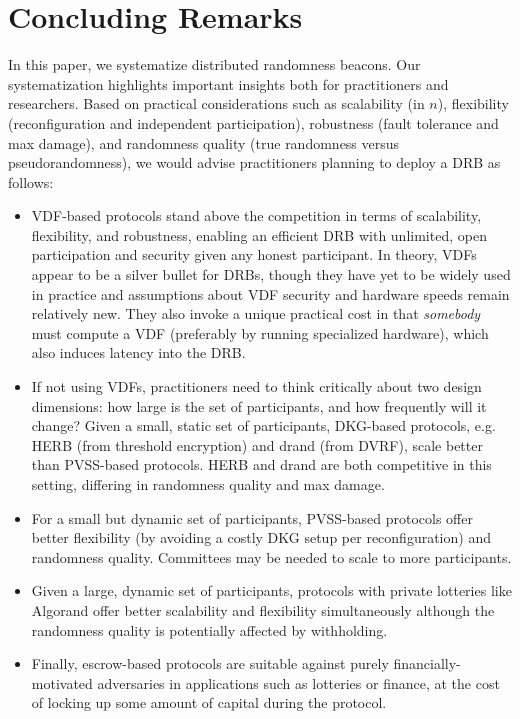 \section{Concluding Remarks}
\label{section:conclusion}
In this paper, we systematize distributed randomness beacons.
Our systematization highlights important insights both for practitioners and researchers. Based on practical considerations such as scalability (in $n$), flexibility (reconfiguration and independent participation), robustness (fault tolerance and max damage), and randomness quality (true randomness versus pseudorandomness), we would advise practitioners planning to deploy a DRB as follows:
\begin{itemize}
    \item {}VDF-based protocols stand above the competition in terms of scalability, flexibility, and robustness, enabling an efficient DRB with unlimited, open participation and security given any honest participant. In theory, VDFs appear to be a silver bullet for DRBs, though they have yet to be widely used in practice and assumptions about VDF security and hardware speeds remain relatively new. They also invoke a unique practical cost in that \emph{somebody} must compute a VDF (preferably by running specialized hardware), which also induces latency into the DRB.
    \item If not using VDFs, practitioners need to think critically about two design dimensions: how large is the set of participants, and how frequently will it change? Given a small, static set of participants, DKG-based protocols, e.g. HERB (from threshold encryption) and drand (from DVRF), scale better than PVSS-based protocols. HERB and drand are both competitive in this setting, differing in randomness quality and max damage.
    \item For a small but dynamic set of participants, PVSS-based protocols offer better flexibility (by avoiding a costly DKG setup per reconfiguration) and randomness quality. Committees may be needed to scale to more participants.
    \item Given a large, dynamic set of participants, protocols with private lotteries like Algorand offer better scalability and flexibility simultaneously although the randomness quality is potentially affected by withholding.
    \item Finally, escrow-based protocols are suitable against purely financially-motivated adversaries in applications such as lotteries or finance, at the cost of locking up some amount of capital during the protocol.
\end{itemize}


